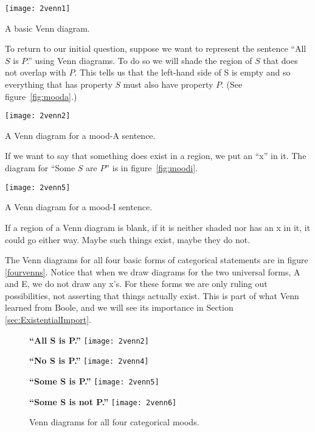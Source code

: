 \begin{marginfigure}
\texttt{[image: 2venn1]}
\caption{A basic Venn diagram.}
\label{fig:basicvenn}
\end{marginfigure}

To return to our initial question, suppose we want to represent the sentence ``All $S$ is $P$.'' using Venn diagrams. To do so we will shade the region of $S$ that does not overlap with $P$. This tells us that the left-hand side of S is empty and so everything that has property $S$ must also have property $P$. (See figure~\ref{fig:mooda}.)

\begin{marginfigure}
\texttt{[image: 2venn2]}
\caption{A Venn diagram for a mood-A sentence.}
\label{fig:mooda}
\end{marginfigure}

If we want to say that something does exist in a region, we put an ``x'' in it. The diagram for ``Some $S$ are $P$'' is in figure~\ref{fig:moodi}.

\begin{marginfigure}
\texttt{[image: 2venn5]}
\caption{A Venn diagram for a mood-I sentence.}
\label{fig:moodi}
\end{marginfigure}


If a region of a Venn diagram is blank, if it is neither shaded nor has an x in it, it could go either way. Maybe such things exist, maybe they do not.

The Venn diagrams for all four basic forms of categorical statements are in figure \ref{fourvenns}. Notice that when we draw diagrams for the two universal forms, A and E, we do not draw any x's. For these forms we are only ruling out possibilities, not asserting that things actually exist. This is part of what Venn learned from Boole, and we will see its importance in Section \ref{sec:ExistentialImport}.

\begin{figure*}[!ht]
\begin{minipage}[t]{0.4\textwidth}\centering
    \textbf{``All S is P.''}
\texttt{[image: 2venn2]}
\end{minipage}\hspace{1cm}
\begin{minipage}[t]{0.4\textwidth}\centering
    \textbf{``No S is P.''}
\texttt{[image: 2venn4]}
\end{minipage}

\vspace{1cm}

\begin{minipage}[t]{0.4\textwidth}\centering
    \textbf{``Some S is P.''}
\texttt{[image: 2venn5]}
\end{minipage}\hspace{1cm}
\begin{minipage}[t]{0.4\textwidth}\centering
    \textbf{``Some S is not P.''}
\texttt{[image: 2venn6]}
\end{minipage}

\vspace{1cm}

\caption{Venn diagrams for all four categorical moods.}
\label{fig:fourvenns}
\end{figure*}


